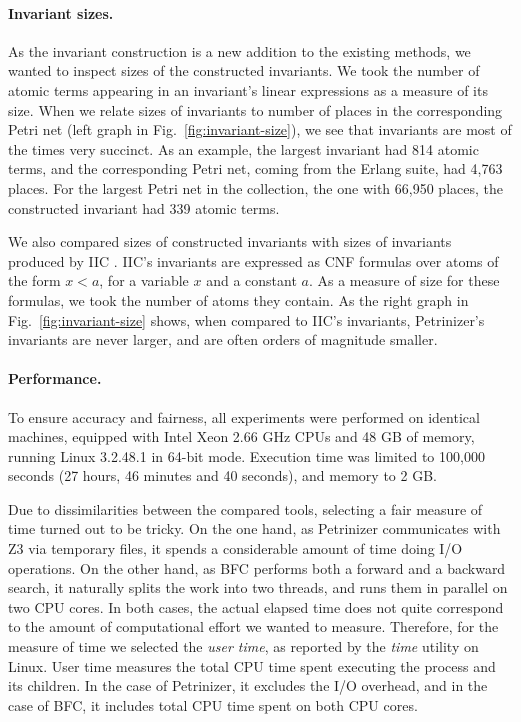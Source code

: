 \paragraph{Invariant sizes.} As the invariant construction is a new addition to
the existing methods, we wanted to inspect sizes of the constructed invariants.
We took the number of atomic terms appearing in an invariant's linear expressions
as a measure of its size. When we relate sizes of invariants to number of places
in the corresponding Petri net (left graph in Fig.~\ref{fig:invariant-size}), we
see that invariants are most of the times very succinct. As an example, the
largest invariant had 814 atomic terms, and the corresponding Petri net, coming
from the Erlang suite, had 4,763 places. For the largest Petri net in the
collection, the one with 66,950 places, the constructed invariant had 339 atomic
terms.

We also compared sizes of constructed invariants with
sizes of invariants produced by IIC \cite{KloosMNP13}. IIC's invariants
are expressed as CNF formulas over atoms of the form $x<a$,
for a variable $x$ and a constant $a$. As a measure of size for these formulas,
we took the number of atoms they contain. As the right graph in
Fig.~\ref{fig:invariant-size} shows, when compared to IIC's invariants, Petrinizer's invariants
are never larger, and are often orders of magnitude smaller.

\paragraph{Performance.} To ensure accuracy and fairness, all experiments were
performed on identical machines, equipped with Intel Xeon 2.66 GHz CPUs and 48 GB of memory, running Linux 3.2.48.1
in 64-bit mode. Execution time was limited to 100,000 seconds (27
hours, 46 minutes and 40 seconds), and memory to 2 GB.

Due to dissimilarities between the compared tools, selecting a fair
measure of time turned out to be tricky. On the one hand, as
Petrinizer communicates with Z3 via temporary files, it spends a
considerable amount of time doing I/O operations.  On the other hand,
as BFC performs both a forward and a backward search, it naturally
splits the work into two threads, and runs them in parallel on two CPU
cores. In both cases, the actual elapsed time does not quite
correspond to the amount of computational effort we wanted to measure.
Therefore, for the measure of time we selected the \emph{user time},
as reported by the \emph{time} utility on Linux. User time measures
the total CPU time spent executing the process and its children. In
the case of Petrinizer, it excludes the I/O overhead, and in the case
of BFC, it includes total CPU time spent on both CPU cores.

